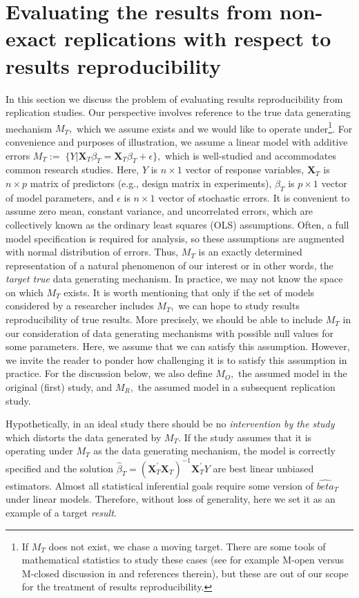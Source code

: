 \documentclass[meta,authordate]{jote-new-article}
\newcommand{\X}{\mathbf{X}}
\newcounter{result}
\begin{document}
\section{Evaluating the results from non-exact replications with respect to results reproducibility}

In this section we discuss the problem of evaluating results reproducibility from replication studies. Our perspective involves reference to the true data generating mechanism $M_T,$ which we assume exists and we would like to operate under\footnote{If $M_T$ does not exist, we chase a moving target. There are some tools of mathematical statistics to study these cases (see for example  M-open versus M-closed discussion in \cite{bernardosmith2000} and references therein), but these are out of our scope for the treatment of results reproducibility.}. For convenience and purposes of illustration, we assume a linear model with additive errors $M_T:= \; \{Y|\X_T\beta_T = \X_T\beta_T+\epsilon\},$
which is well-studied and accommodates common research studies. Here, $Y$ is $n \times 1$ vector of response variables, $\X_T$ is $n \times p$ matrix of predictors (e.g., design matrix in experiments), $\beta_T$ is $p \times 1$ vector of model parameters, and $\epsilon$ is $n \times 1$ vector of stochastic errors. It is convenient to assume zero mean, constant variance, and uncorrelated errors, which are collectively known as the ordinary least squares (OLS) assumptions. Often, a full model specification is required for analysis, so these assumptions are augmented with normal distribution of errors. Thus, $M_T$ is an exactly determined representation of a natural phenomenon of our interest or in other words, the {\em target true} data generating mechanism. In practice, we may not know the space on which $M_T$ exists. It is worth mentioning that only if the set of models considered by a researcher includes $M_T,$ we can hope to study results reproducibility of true results. More precisely, we should be able to include $M_T$ in our consideration of data generating mechanisms with possible null values for some parameters. Here, we assume that we can satisfy this assumption. However, we invite the reader to ponder how challenging it is to satisfy this assumption in practice. For the discussion below, we also define $M_O,$ the assumed model in the original (first) study, and $M_R,$ the assumed model in a subsequent replication study.

Hypothetically, in an ideal study there should be no {\em intervention by the study} which distorts the data generated by $M_T.$ If the study assumes that it is operating under $M_T$ as the data generating mechanism, the model is correctly specified and the solution $\hat{\beta}_{T}= (\X_{T}^{'}\X_{T})^{-1}\X_{T}^{'} Y$ are best linear unbiased estimators. Almost all statistical inferential goals require some version of $\hat{beta}_T$ under linear models. Therefore, without loss of generality, here we set it as an example of a target {\em result}.
\end{document}
